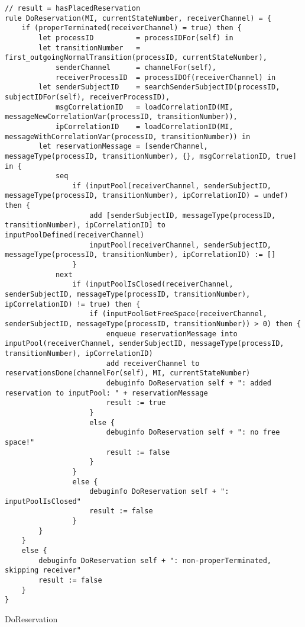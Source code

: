 \begin{listing}[H]
\begin{verbatim}
// result = hasPlacedReservation
rule DoReservation(MI, currentStateNumber, receiverChannel) = {
    if (properTerminated(receiverChannel) = true) then {
        let processID          = processIDFor(self) in
        let transitionNumber   = first_outgoingNormalTransition(processID, currentStateNumber),
            senderChannel      = channelFor(self),
            receiverProcessID  = processIDOf(receiverChannel) in
        let senderSubjectID    = searchSenderSubjectID(processID, subjectIDFor(self), receiverProcessID),
            msgCorrelationID   = loadCorrelationID(MI, messageNewCorrelationVar(processID, transitionNumber)),
            ipCorrelationID    = loadCorrelationID(MI, messageWithCorrelationVar(processID, transitionNumber)) in
        let reservationMessage = [senderChannel, messageType(processID, transitionNumber), {}, msgCorrelationID, true] in {
            seq
                if (inputPool(receiverChannel, senderSubjectID, messageType(processID, transitionNumber), ipCorrelationID) = undef) then {
                    add [senderSubjectID, messageType(processID, transitionNumber), ipCorrelationID] to inputPoolDefined(receiverChannel)
                    inputPool(receiverChannel, senderSubjectID, messageType(processID, transitionNumber), ipCorrelationID) := []
                }
            next
                if (inputPoolIsClosed(receiverChannel, senderSubjectID, messageType(processID, transitionNumber), ipCorrelationID) != true) then {
                    if (inputPoolGetFreeSpace(receiverChannel, senderSubjectID, messageType(processID, transitionNumber)) > 0) then {
                        enqueue reservationMessage into inputPool(receiverChannel, senderSubjectID, messageType(processID, transitionNumber), ipCorrelationID)
                        add receiverChannel to reservationsDone(channelFor(self), MI, currentStateNumber)
                        debuginfo DoReservation self + ": added reservation to inputPool: " + reservationMessage
                        result := true
                    }
                    else {
                        debuginfo DoReservation self + ": no free space!"
                        result := false
                    }
                }
                else {
                    debuginfo DoReservation self + ": inputPoolIsClosed"
                    result := false
                }
        }
    }
    else {
        debuginfo DoReservation self + ": non-properTerminated, skipping receiver"
        result := false
    }
}
\end{verbatim}
\caption{DoReservation}
\label{lst:asm:DoReservation}
\end{listing}




